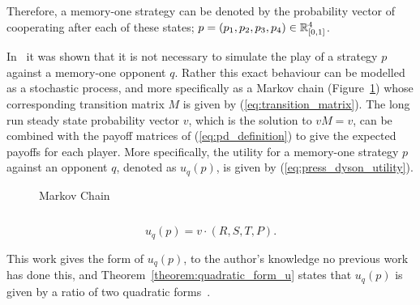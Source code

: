 Therefore, a memory-one strategy can be denoted by the probability vector of
cooperating after each of these states; \(p=(p_1, p_2, p_3, p_4) \in \mathbb{R}_{[0,1]}
^ 4\).

In~\cite{Nowak1989} it was shown that it is not necessary to simulate the play
of a strategy $p$ against a memory-one opponent $q$. Rather this exact behaviour
can be modelled as a stochastic process, and more specifically as a Markov chain
(Figure~\ref{fig:markov_chain}) whose corresponding transition matrix \(M\) is
given by (\ref{eq:transition_matrix}). The long run steady state probability
vector \(v\), which is the solution to \(v M = v\), can be
combined with the payoff matrices of (\ref{eq:pd_definition}) to give the expected
payoffs for each player. More specifically, the utility for a memory-one
strategy \(p\) against an opponent \(q\), denoted as \(u_q(p)\), is given by
(\ref{eq:press_dyson_utility}).

\begin{figure}
    \centering
    
    \caption{Markov Chain}
    \label{fig:markov_chain}
\end{figure}

\begin{equation}\label{eq:transition_matrix}
    
\end{equation}


\begin{equation}\label{eq:press_dyson_utility}
    u_q(p) = v \cdot (R, S, T, P).
\end{equation}

This work gives the form of \(u_q(p)\), to the author's knowledge no
previous work has done this, and Theorem~\ref{theorem:quadratic_form_u} states that \(u_q(p)\)
is given by a ratio of two quadratic forms~\cite{kepner2011}.

